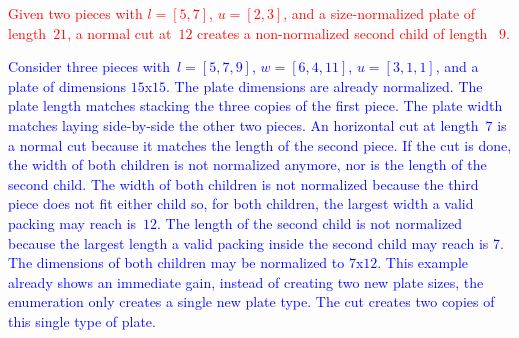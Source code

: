 \documentclass[smallextended]{svjour3}       %
\newif\iffinalversion
\newcommand{\newtext}[1]{\iffinalversion%
#1%
\else%
\textcolor{blue}{#1}%
\fi%
}
\newcommand{\oldtext}[1]{\iffinalversion%
#1%
\else%
\textcolor{red}{#1}%
\fi%
}
\begin{document}

\begin{example}\label{ex:renormalization_after_cut}
\oldtext{Given two pieces with \(l = [5, 7]\), \(u = [2, 3]\), and a size-normalized plate of length~\(21\), a normal cut at~\(12\) creates a non-normalized second child of length~ \(9\).}
\newtext{Consider three pieces with~\(l = [5, 7, 9]\), \(w = [6, 4, 11]\), \(u = [3, 1, 1]\), and a plate of dimensions \(15\)x\(15\). The plate dimensions are already normalized. The plate length matches stacking the three copies of the first piece. The plate width matches laying side-by-side the other two pieces. An horizontal cut at length~\(7\) is a normal cut because it matches the length of the second piece. If the cut is done, the width of both children is not normalized anymore, nor is the length of the second child. The width of both children is not normalized because the third piece does not fit either child so, for both children, the largest width a valid packing may reach is~\(12\). The length of the second child is not normalized because the largest length a valid packing inside the second child may reach is 7. The dimensions of both children may be normalized to \(7\)x\(12\). This example already shows an immediate gain, instead of creating two new plate sizes, the enumeration only creates a single new plate type. The cut creates two copies of this single type of plate.}
\end{example}
\end{document}
